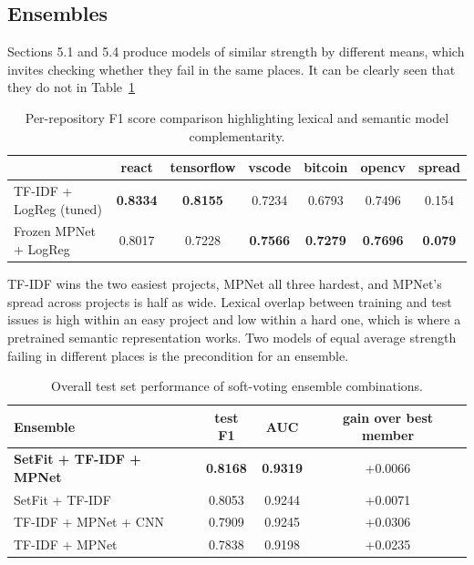 
\subsection{Ensembles}

Sections 5.1 and 5.4 produce models of similar strength by different means, which invites checking whether they fail in the same places. It can be clearly seen that they do not in Table~\ref{tab:model_complementarity}

\begin{table}[H]
\centering
\caption{Per-repository F1 score comparison highlighting lexical and semantic model complementarity.}
\label{tab:model_complementarity}
\vspace{0.5em}
\begin{tabular}{l c c c c c c}
\hline
 & react & tensorflow & vscode & bitcoin & opencv & spread \\
\hline
TF-IDF + LogReg (tuned) & \textbf{0.8334} & \textbf{0.8155} & 0.7234 & 0.6793 & 0.7496 & 0.154 \\
Frozen MPNet + LogReg & 0.8017 & 0.7228 & \textbf{0.7566} & \textbf{0.7279} & \textbf{0.7696} & \textbf{0.079} \\
\hline
\end{tabular}
\end{table}

TF-IDF wins the two easiest projects, MPNet all three hardest, and MPNet's spread across projects is half as wide. Lexical overlap between training and test issues is high within an easy project and low within a hard one, which is where a pretrained semantic representation works. Two models of equal average strength failing in different places is the precondition for an ensemble.

\begin{table}[H]
\centering
\caption{Overall test set performance of soft-voting ensemble combinations.}
\label{tab:ensemble_results}
\vspace{0.5em}
\begin{tabular}{l c c c}
\hline
Ensemble & test F1 & AUC & gain over best member \\
\hline
\textbf{SetFit + TF-IDF + MPNet} & \textbf{0.8168} & \textbf{0.9319} & +0.0066 \\
SetFit + TF-IDF & 0.8053 & 0.9244 & +0.0071 \\
TF-IDF + MPNet + CNN & 0.7909 & 0.9245 & +0.0306 \\
TF-IDF + MPNet & 0.7838 & 0.9198 & +0.0235 \\
\hline
\end{tabular}
\end{table}


